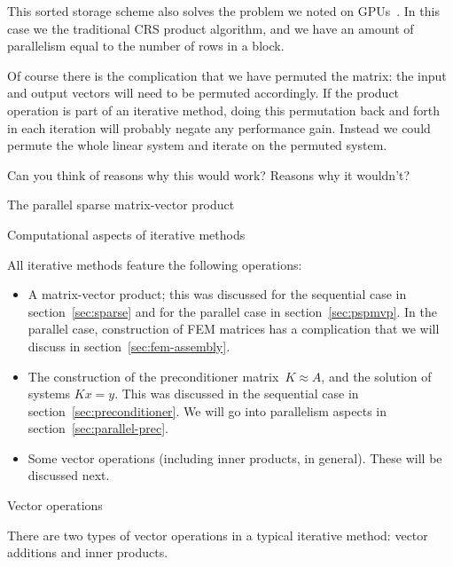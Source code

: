 This sorted storage scheme also solves the problem we noted on
\acp{GPU}~\cite{Bolz:GPUsparse}. In this case we the traditional
\ac{CRS} product algorithm, and we have an amount of parallelism equal
to the number of rows in a block.

Of course there is the complication that we have permuted the matrix:
the input and output vectors will need to be permuted accordingly. If
the product operation is part of an iterative method, doing this
permutation back and forth in each iteration will probably negate any
performance gain. Instead we could permute the whole linear system and
iterate on the permuted system.
\begin{exercise}
  Can you think of reasons why this would work? Reasons why it wouldn't?
\end{exercise}

 {The parallel sparse matrix-vector product}
\label{sec:spmvp}


 {Computational aspects of iterative methods}
\label{sec:iterative-computational}

All iterative methods feature the following operations:
\begin{itemize}
\item A matrix-vector product; this was discussed for the sequential
  case in section~\ref{sec:sparse} and for the parallel case in
  section~\ref{sec:pspmvp}.
  In the parallel case,
  construction of \ac{FEM} matrices has a complication that we will
  discuss in section~\ref{sec:fem-assembly}.
\item The construction of the preconditioner matrix~$K\approx A$, and
  the solution of systems $Kx=y$. This was discussed in the sequential
  case in section~\ref{sec:preconditioner}.
  We will go into parallelism aspects in section~\ref{sec:parallel-prec}.
\item Some vector operations (including inner products, in
  general). These will be discussed next.
\end{itemize}

 {Vector operations}

There are two types of vector operations in a typical iterative method:
vector additions and inner products. 

